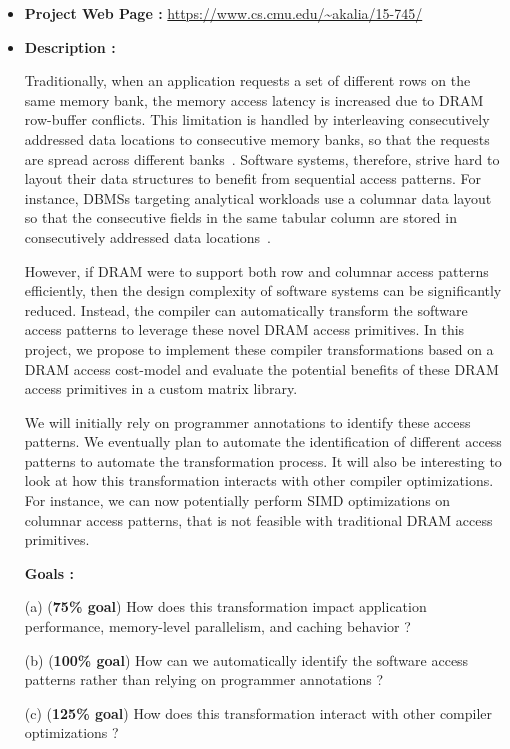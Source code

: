 \documentclass[letterpaper]{article}
\begin{document}
\begin{itemize}

\item \textbf{Project Web Page :} \url{https://www.cs.cmu.edu/~akalia/15-745/}

\item \textbf{Description :} 

Traditionally, when an application requests a set of different rows 
on the same memory bank, the memory access latency is increased due
to DRAM row-buffer conflicts.
This limitation is handled by interleaving consecutively 
addressed data locations to consecutive memory banks, so that
the requests are spread across different banks~\cite{dram1}.
Software systems, therefore, strive hard to layout their data structures 
to benefit from sequential access patterns. 
For instance, DBMSs targeting analytical workloads use a columnar data 
layout so that the consecutive fields in the same tabular column are stored in
consecutively addressed data locations~\cite{col1}.

However, if DRAM were to support both row and columnar access patterns
efficiently, then the design complexity of software systems can be significantly 
reduced. Instead, the compiler can automatically transform the software access
patterns to leverage these novel DRAM access primitives. 
In this project, we propose to implement these compiler transformations based
on a DRAM access cost-model and evaluate the potential benefits of these DRAM
access primitives in a custom matrix library. 

We will initially rely on programmer annotations to identify these access
patterns.
We eventually plan to automate the identification of different access patterns
to automate the transformation process.
It will also be interesting to look at how this transformation interacts with
other compiler optimizations. For instance, we can now potentially perform
SIMD optimizations on columnar access patterns, that is not feasible with
traditional DRAM access primitives.

\textbf{Goals :}

(a) (\textbf{75\% goal}) How does this transformation impact application
performance, memory-level parallelism, and caching behavior ? 

(b) (\textbf{100\% goal}) How can we automatically identify the software access
patterns rather than relying on programmer annotations ?

(c) (\textbf{125\% goal}) How does this transformation interact with other
compiler optimizations ?

\end{itemize}
\end{document}
